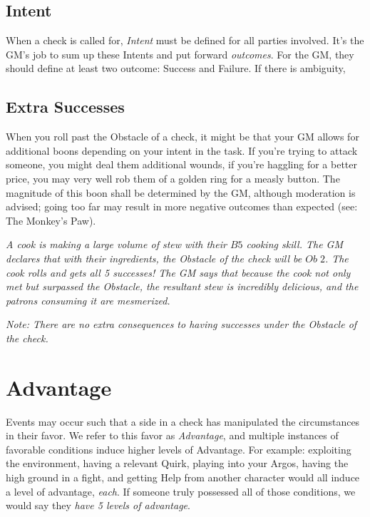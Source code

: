 \documentclass[../main.tex]{subfiles}
\begin{document}
    \subsection{Intent}

    When a check is called for, \emph{Intent} must be defined for all parties involved. It's the GM's job to sum up these Intents and put forward \emph{outcomes}. For the GM, they should define at least two outcome: Success and Failure. If there is ambiguity, 

    \subsection{Extra Successes}

    When you roll past the Obstacle of a check, it might be that your GM allows for additional boons depending on your intent in the task. If you're trying to attack someone, you might deal them additional wounds, if you're haggling for a better price, you may very well rob them of a golden ring for a measly button. The magnitude of this boon shall be determined by the GM, although moderation is advised; going too far may result in more negative outcomes than expected (see: The Monkey's Paw).
    \\
    \begin{mdframed}[style=Arrata]
        {\em A cook is making a large volume of stew with their $B5$ cooking skill. The GM declares that with their ingredients, the Obstacle of the check will be $Ob\; 2$. The cook rolls and gets all 5 successes! The GM says that because the cook not only met but surpassed the Obstacle, the resultant stew is incredibly delicious, and the patrons consuming it are mesmerized.}
    \end{mdframed}

    \emph{Note: There are no extra consequences to having successes under the Obstacle of the check.}
    
    \section{Advantage}

        Events may occur such that a side in a check has manipulated the circumstances in their favor. We refer to this favor as \emph{Advantage}, and multiple instances of favorable conditions induce higher levels of Advantage. For example: exploiting the environment, having a relevant Quirk, playing into your Argos, having the high ground in a fight, and getting Help from another character would all induce a level of advantage, \emph{each}. If someone truly possessed all of those conditions, we would say they \emph{have 5 levels of advantage}. 
\end{document}
